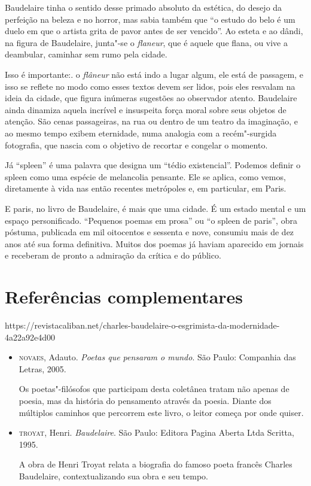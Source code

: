 \documentclass[12pt]{extarticle}
\begin{document}
Baudelaire tinha o sentido desse primado absoluto da estética, do
desejo da perfeição na beleza e no horror, mas sabia também que ``o
estudo do belo é um duelo em que o artista grita de pavor antes de ser
vencido''.
Ao esteta e ao dândi, na figura de Baudelaire, junta"-se o \textit{flaneur},
que é aquele que flana, ou vive a deambular, caminhar sem rumo pela
cidade.

Isso é importante:. o \textit{flâneur} não está indo a lugar algum, ele está de
passagem, e isso se reflete no modo como esses textos devem ser lidos,
pois eles resvalam na ideia da cidade, que figura inúmeras sugestões ao observador atento.
Baudelaire ainda dinamiza aquela incrível e insuspeita força moral sobre
seus objetos de atenção.
São cenas passageiras, na rua ou dentro de um teatro da imaginação, e
ao mesmo tempo exibem eternidade, numa analogia com a recém"-surgida
fotografia, que nascia com o objetivo de recortar e congelar o
momento.

Já ``spleen'' é uma palavra que designa um ``tédio existencial''.
Podemos definir o spleen como uma espécie de melancolia pensante.
Ele se aplica, como vemos, diretamente à vida nas então recentes
metrópoles e, em particular, em Paris.




E paris, no livro de Baudelaire, é mais que uma cidade. É um estado
mental e um espaço personificado.
``Pequenos poemas em prosa'' ou ``o spleen de paris'', obra póstuma,
publicada em mil oitocentos e sessenta e nove, consumiu mais de dez
anos até sua forma definitiva.
Muitos dos poemas já haviam aparecido em jornais e receberam de pronto a
admiração da crítica e do público.

\section{Referências complementares}




https://revistacaliban.net/charles-baudelaire-o-esgrimista-da-modernidade-4a22a92e4d00

\begin{itemize}
\item\textsc{novaes}, Adauto. \textit{Poetas que pensaram o mundo}. São Paulo:
Companhia das Letras, 2005.

Os poetas"-filósofos que participam desta coletânea tratam não apenas de
poesia, mas da história do pensamento através da poesia. Diante dos
múltiplos caminhos que percorrem este livro, o leitor começa por onde
quiser.

\item\textsc{troyat}, Henri. \textit{Baudelaire}. São Paulo: Editora Pagina Aberta Ltda Scritta, 1995.

A obra de Henri Troyat relata a biografia do famoso poeta francês
Charles Baudelaire, contextualizando sua obra e seu tempo.
\end{itemize}
\end{document}
